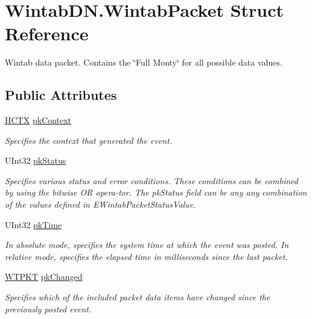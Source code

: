 \hypertarget{struct_wintab_d_n_1_1_wintab_packet}{}\section{Wintab\+D\+N.\+Wintab\+Packet Struct Reference}
\label{struct_wintab_d_n_1_1_wintab_packet}


Wintab data packet. Contains the \char`\"{}\+Full Monty\char`\"{} for all possible data values.  


\subsection*{Public Attributes}
\begin{DoxyCompactItemize}
\item 
\mbox{\hyperlink{class_wintab_d_n_1_1_h_c_t_x}{H\+C\+TX}} \mbox{\hyperlink{struct_wintab_d_n_1_1_wintab_packet_a61891db49d8d8f38ace11982c406d27f}{pk\+Context}}
\begin{DoxyCompactList}\small\item\em Specifies the context that generated the event. \end{DoxyCompactList}\item 
U\+Int32 \mbox{\hyperlink{struct_wintab_d_n_1_1_wintab_packet_acab466b784a0d38759f246940f7faccd}{pk\+Status}}
\begin{DoxyCompactList}\small\item\em Specifies various status and error conditions. These conditions can be combined by using the bitwise OR opera-\/tor. The pk\+Status field can be any any combination of the values defined in E\+Wintab\+Packet\+Status\+Value. \end{DoxyCompactList}\item 
U\+Int32 \mbox{\hyperlink{struct_wintab_d_n_1_1_wintab_packet_a9296716584867a40acdc50f831ecb68c}{pk\+Time}}
\begin{DoxyCompactList}\small\item\em In absolute mode, specifies the system time at which the event was posted. In relative mode, specifies the elapsed time in milliseconds since the last packet. \end{DoxyCompactList}\item 
\mbox{\hyperlink{class_wintab_d_n_1_1_w_t_p_k_t}{W\+T\+P\+KT}} \mbox{\hyperlink{struct_wintab_d_n_1_1_wintab_packet_aa2d358ed11aeb84cd10c943c17c123c1}{pk\+Changed}}
\begin{DoxyCompactList}\small\item\em Specifies which of the included packet data items have changed since the previously posted event. \end{DoxyCompactList}\item 

\end{DoxyCompactItemize}
